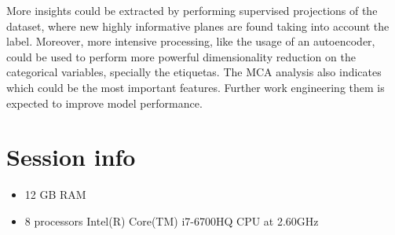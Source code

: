 \documentclass{article}\usepackage[]{graphicx}\usepackage[]{color}
\begin{document}
More insights could be extracted by performing supervised projections of the dataset, where new highly informative planes are found taking into account the label. Moreover, more intensive processing, like the usage of an autoencoder, could be used to perform more powerful dimensionality reduction on the categorical variables, specially the etiquetas. The MCA analysis also indicates which could be the most important features. Further work engineering them is expected to improve model performance.



\section{Session info}
\begin{itemize}
\item 12 GB RAM
\item 8 processors Intel(R) Core(TM) i7-6700HQ CPU at 2.60GHz
\end{itemize}
\end{document}
